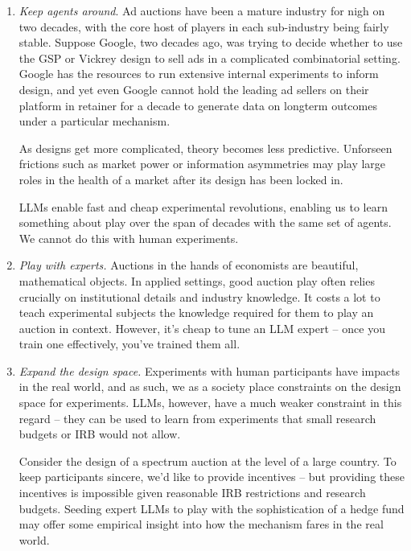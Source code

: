 \documentclass{article} %
\begin{document}
\begin{enumerate}
    \item \textit{Keep agents around}. Ad auctions have been a mature industry for nigh on two decades, with the core host of players in each sub-industry being fairly stable. Suppose Google, two decades ago, was trying to decide whether to use the GSP or Vickrey design to sell ads in a complicated combinatorial setting. Google has the resources to run extensive internal experiments to inform design, and yet even Google cannot hold the leading ad sellers on their platform in retainer for a decade to generate data on longterm outcomes under a particular mechanism.

    As designs get more complicated, theory becomes less predictive. Unforseen frictions such as market power or information asymmetries may play large roles in the health of a market after its design has been locked in.

    LLMs enable fast and cheap experimental revolutions, enabling us to learn something about play over the span of decades with the same set of agents. We cannot do this with human experiments.

    \item \textit{Play with experts.} Auctions in the hands of economists are beautiful, mathematical objects. In applied settings, good auction play often relies crucially on institutional details and industry knowledge. It costs a lot to teach experimental subjects the knowledge required for them to play an auction in context. However, it's cheap to tune an LLM expert -- once you train one effectively, you've trained them all.

    \item \textit{Expand the design space.} Experiments with human participants have impacts in the real world, and as such, we as a society place constraints on the design space for experiments. LLMs, however, have a much weaker constraint in this regard -- they can be used to learn from experiments that small research budgets or IRB would not allow. 

    Consider the design of a spectrum auction at the level of a large country. To keep participants sincere, we'd like to provide incentives -- but providing these incentives is impossible given reasonable IRB restrictions and research budgets. Seeding expert LLMs to play with the sophistication of a hedge fund may offer some empirical insight into how the mechanism fares in the real world.



\end{enumerate}
\end{document}
